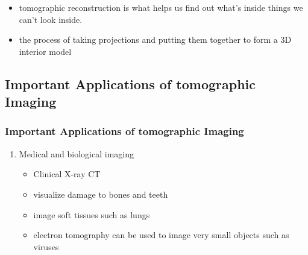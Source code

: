 \documentclass{beamer}
\newcounter{saveenumi}
\newcommand{\seti}{\setcounter{saveenumi}{\value{enumi}}}
\begin{document}
\begin{frame}
	\begin{itemize}
\item tomographic reconstruction is what helps us find out what's inside things we can't look inside.
\item the process of taking projections and putting them together to form a 3D interior model
	\end{itemize}
	\end{frame}


\subsection{Important Applications of tomographic Imaging}
\begin{frame}
	\frametitle{Important Applications of tomographic Imaging}
	\begin{enumerate}
		\item Medical and biological imaging
			\begin{itemize}
				\item Clinical X-ray CT
				\item visualize damage to bones and teeth
				\item image soft tissues such as lungs
				\item electron tomography can be used to image very small objects such as viruses 
			\end{itemize}
			\seti
	\end{enumerate}
\end{frame}
\end{document}
